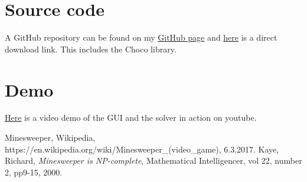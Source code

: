 \documentclass[11pt,a4paper,notitlepage]{article}
\theoremstyle{definition}
\begin{document}
\section{Source code}
A GitHub repository can be found on my \href{https://github.com/JonSteinn}{GitHub page} and \href{https://github.com/JonSteinn/Minesweeper/archive/master.zip}{here} is a direct download link. This includes the Choco library.
\section{Demo}
\href{https://www.youtube.com/watch?v=ocDPL8nYT2o}{Here} is a video demo of the GUI and the solver in action on youtube.


\newpage
\begin{thebibliography}{2}
 Minesweeper, Wikipedia, https://en.wikipedia.org/wiki/Minesweeper\_(video\_game), 6.3.2017.
 Kaye, Richard, \emph{Minesweeper is NP-complete}, Mathematical Intelligencer, vol 22, number 2, pp9-15, 2000.
\end{thebibliography}
\end{document}
